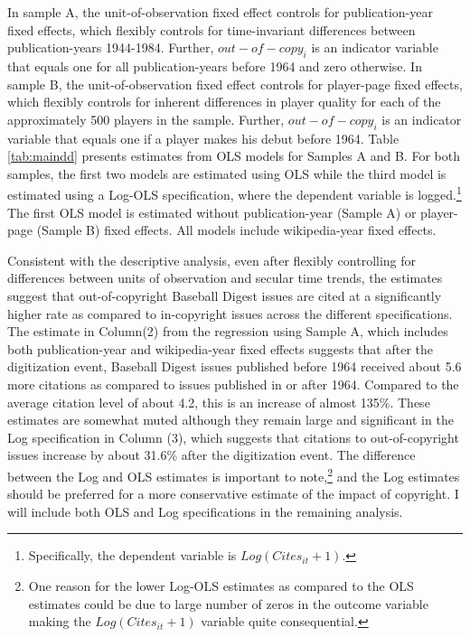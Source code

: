 \documentclass[11pt]{article}
\begin{document}
In sample A, the unit-of-observation fixed effect controls for publication-year fixed effects, which flexibly controls for time-invariant differences between publication-years 1944-1984. Further, $out-of-copy_i$ is an indicator variable that equals one for all publication-years before 1964 and zero otherwise. In sample B, the unit-of-observation fixed effect controls for player-page fixed effects, which flexibly controls  for inherent differences in player quality for each of the approximately 500 players in the sample. Further, $out-of-copy_i$ is an indicator variable that equals one if a player makes his debut before 1964. Table \ref{tab:maindd} presents estimates from OLS models for Samples A and B. For both samples, the first two models are estimated using OLS while the third model is estimated using a Log-OLS specification, where the dependent variable is logged.\footnote{Specifically, the dependent variable is $Log(Cites_{it}+1)$.} The first OLS model is estimated without publication-year (Sample A) or player-page (Sample B) fixed effects. All models include wikipedia-year fixed effects.

Consistent with the descriptive analysis, even after flexibly controlling for differences between units of observation and secular time trends, the estimates suggest that out-of-copyright Baseball Digest issues are cited at a significantly higher rate as compared to in-copyright issues across the different specifications. The estimate in Column(2) from the regression using Sample A, which includes both publication-year and wikipedia-year fixed effects suggests that after the digitization event, Baseball Digest issues published before 1964 received about 5.6 more citations as compared to issues published in or after 1964. Compared to the average citation level of about 4.2, this is an increase of almost 135\%. These estimates are somewhat muted although they remain large and significant in the Log specification in Column (3), which suggests that citations to out-of-copyright issues increase by about 31.6\% after the digitization event. The difference between the Log and OLS estimates is important to note,\footnote{One reason for the lower Log-OLS estimates as compared to the OLS estimates could be due to large number of zeros in the outcome variable making the $Log(Cites_{it}+1)$ variable quite consequential.} and the Log estimates should be preferred for a more conservative estimate of the impact of copyright. I will include both OLS and Log specifications in the remaining analysis. 
\end{document}
